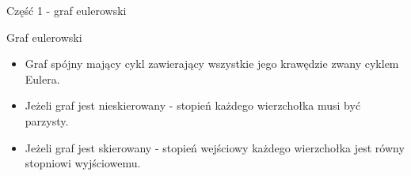 \documentclass[polish,envcountsect,10pt]{beamer}
\begin{document}
\begin{frame}{Część 1 - graf eulerowski}
    \begin{block}{Graf eulerowski}
        \begin{itemize}
        \item Graf spójny mający cykl zawierający wszystkie jego krawędzie zwany cyklem Eulera.
        \item Jeżeli graf jest nieskierowany - stopień każdego wierzchołka musi być parzysty.
        \item Jeżeli graf jest skierowany - stopień wejściowy każdego wierzchołka jest równy stopniowi wyjściowemu.
        \end{itemize}
    \end{block}
    \begin{center}
    \end{center}
\end{frame}
\end{document}

